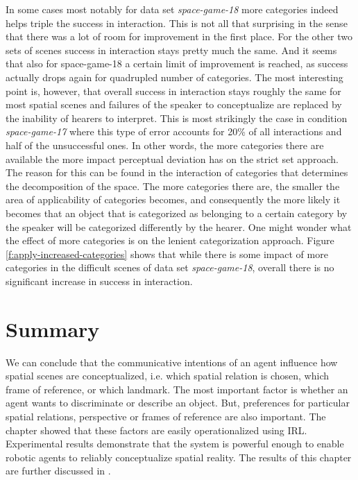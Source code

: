 In some cases most notably for data set \emph{space-game-18} 
more categories indeed helps triple the success in interaction. This is not all that
surprising in the sense that there was a lot of room for improvement in the 
first place. For the other two sets of scenes success in interaction stays 
pretty much the same. And it seems that also for space-game-18 a certain
limit of improvement is reached, as success actually drops again for quadrupled
number of categories. The most interesting point is, however, that overall 
success in interaction stays roughly the same for most spatial scenes 
and failures of the speaker to conceptualize
are replaced by the inability of hearers to interpret. This is most strikingly the case
in condition \emph{space-game-17} where this type of error accounts for 20\% of all
interactions and half of the unsuccessful ones. In other words, the more categories 
there are available the more impact perceptual deviation has on the strict set approach.
The reason for this can be found in the interaction of categories that determines 
the decomposition of the space. The more categories there are, the smaller the 
area of applicability of categories
becomes, and consequently the more likely it becomes that an object that is
categorized as belonging to a certain category by the speaker will be 
categorized differently by the hearer. One might
wonder what the effect of more categories is on the lenient categorization
approach. Figure \ref{f:apply-increased-categories} shows that while there
is some impact of more categories in the difficult scenes of data set
\emph{space-game-18}, overall there is no significant increase in success in
interaction.

\section{Summary}
We can conclude that the communicative intentions of an agent influence
how spatial scenes are conceptualized, i.e. which spatial relation is chosen, 
which frame of reference, or which landmark. The most important
factor is whether an agent wants to discriminate or describe an object.
But, preferences for particular spatial relations, perspective or frames of 
reference are also important. The chapter showed that these factors
are easily operationalized using IRL. Experimental results demonstrate that the system
is powerful enough to enable robotic agents to reliably conceptualize 
spatial reality. The results of this chapter are further discussed in \cite{pauw2010embodied,pauw2012embodied,spranger2012deviation}.



% 
% 
% 
